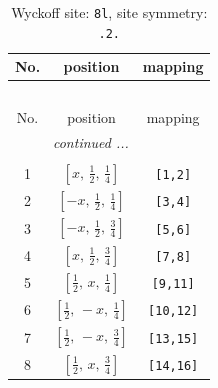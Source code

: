\documentclass[fleqn,8pt]{jsarticle}
\begin{document}
\begin{longtable}{ccc}
\caption{Wyckoff site: {\tt 8l}, site symmetry: {\tt .2.}}
 \\
 \hline \hline
No. & position & mapping \\ \hline \endfirsthead

\multicolumn{2}{l}{\tablename\ \thetable{}} \\
 \hline \hline
No. & position & mapping \\ \hline \endhead

 \hline \hline
\multicolumn{2}{r}{\footnotesize\it continued ...} \\ \endfoot

 \hline \hline
\multicolumn{2}{r}{} \\ \endlastfoot

1 & $\left[ x,\, \frac{1}{2},\, \frac{1}{4} \right]$ & {\tt [1,2]} \\ \hline
2 & $\left[ - x,\, \frac{1}{2},\, \frac{1}{4} \right]$ & {\tt [3,4]} \\ \hline
3 & $\left[ - x,\, \frac{1}{2},\, \frac{3}{4} \right]$ & {\tt [5,6]} \\ \hline
4 & $\left[ x,\, \frac{1}{2},\, \frac{3}{4} \right]$ & {\tt [7,8]} \\ \hline
5 & $\left[ \frac{1}{2},\, x,\, \frac{1}{4} \right]$ & {\tt [9,11]} \\ \hline
6 & $\left[ \frac{1}{2},\, - x,\, \frac{1}{4} \right]$ & {\tt [10,12]} \\ \hline
7 & $\left[ \frac{1}{2},\, - x,\, \frac{3}{4} \right]$ & {\tt [13,15]} \\ \hline
8 & $\left[ \frac{1}{2},\, x,\, \frac{3}{4} \right]$ & {\tt [14,16]} \\
\end{longtable}
\renewcommand{\arraystretch}{1.2}
\end{document}
